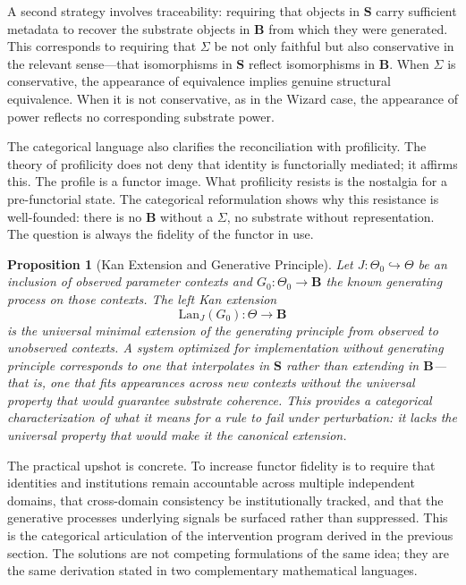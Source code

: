 \documentclass[11pt]{article}
\newtheorem{proposition}{Proposition}
\begin{document}
A second strategy involves traceability: requiring that objects in $\mathbf{S}$ carry sufficient metadata to recover the substrate objects in $\mathbf{B}$ from which they were generated. This corresponds to requiring that $\Sigma$ be not only faithful but also conservative in the relevant sense---that isomorphisms in $\mathbf{S}$ reflect isomorphisms in $\mathbf{B}$. When $\Sigma$ is conservative, the appearance of equivalence implies genuine structural equivalence. When it is not conservative, as in the Wizard case, the appearance of power reflects no corresponding substrate power.

The categorical language also clarifies the reconciliation with profilicity. The theory of profilicity does not deny that identity is functorially mediated; it affirms this. The profile is a functor image. What profilicity resists is the nostalgia for a pre-functorial state. The categorical reformulation shows why this resistance is well-founded: there is no $\mathbf{B}$ without a $\Sigma$, no substrate without representation. The question is always the fidelity of the functor in use.

\begin{proposition}[Kan Extension and Generative Principle]
Let $J : \Theta_0 \hookrightarrow \Theta$ be an inclusion of observed parameter contexts and $G_0 : \Theta_0 \to \mathbf{B}$ the known generating process on those contexts. The left Kan extension
\[
\mathrm{Lan}_J(G_0) : \Theta \to \mathbf{B}
\]
is the universal minimal extension of the generating principle from observed to unobserved contexts. A system optimized for implementation without generating principle corresponds to one that interpolates in $\mathbf{S}$ rather than extending in $\mathbf{B}$---that is, one that fits appearances across new contexts without the universal property that would guarantee substrate coherence. This provides a categorical characterization of what it means for a rule to fail under perturbation: it lacks the universal property that would make it the canonical extension.
\end{proposition}

The practical upshot is concrete. To increase functor fidelity is to require that identities and institutions remain accountable across multiple independent domains, that cross-domain consistency be institutionally tracked, and that the generative processes underlying signals be surfaced rather than suppressed. This is the categorical articulation of the intervention program derived in the previous section. The solutions are not competing formulations of the same idea; they are the same derivation stated in two complementary mathematical languages.
\end{document}
